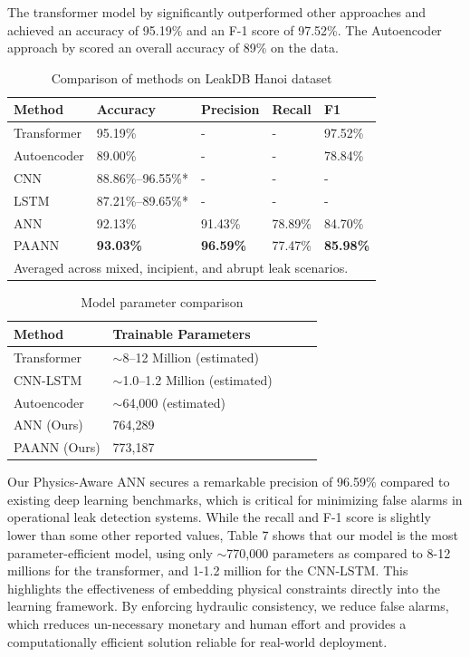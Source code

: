 \documentclass[final,5p,times,twocolumn,authoryear]{elsarticle}
\begin{document}
The transformer model by \cite{s24196294} significantly outperformed other approaches and achieved an accuracy of 95.19\% and an F-1 score of 97.52\%. The Autoencoder approach by \cite{10095760} scored an overall accuracy of 89\% on the data.

\begin{table}[!htbp]
\centering
\caption{Comparison of methods on LeakDB Hanoi dataset}
\label{tab:benchmark_comparison}
\begin{tabular}{@{}lllll@{}}
\toprule
\textbf{Method} & \textbf{Accuracy} & \textbf{Precision} & \textbf{Recall} & \textbf{F1} \\
\midrule
Transformer & 95.19\% & - & - & 97.52\% \\ 
Autoencoder & 89.00\% & - & - & 78.84\% \\
CNN & 88.86\%--96.55\%* & - & - & - \\
LSTM & 87.21\%--89.65\%* & - & - & - \\
ANN & 92.13\% & 91.43\% & 78.89\% & 84.70\% \\
PAANN & \textbf{93.03\%} & \textbf{96.59\%} & 77.47\% & \textbf{85.98\%} \\
\bottomrule
\multicolumn{5}{l}{\footnotesize *Averaged across mixed, incipient, and abrupt leak scenarios.}
\end{tabular}
\end{table}

\begin{table}[!htbp]
\centering
\caption{Model parameter comparison}
\label{tab:parameter_comparison}
\begin{tabular}{@{}lllll@{}}
\toprule
\textbf{Method} & \textbf{Trainable Parameters} \\
\midrule
Transformer & $\sim$8--12 Million (estimated) \\
CNN-LSTM & $\sim$1.0--1.2 Million (estimated) \\
Autoencoder & $\sim$64,000 (estimated) \\
ANN (Ours) & 764,289 \\
PAANN (Ours) & 773,187 \\
\bottomrule
\end{tabular}
\end{table}

Our Physics-Aware ANN secures a remarkable precision of 96.59\% compared to existing deep learning benchmarks, which is critical for minimizing false alarms in operational leak detection systems. While the recall and F-1 score is slightly lower than some other reported values, Table 7 shows that our model is the most parameter-efficient model, using only $\sim$770,000 parameters as compared to 8-12 millions for the transformer, and 1-1.2 million for the CNN-LSTM.
This highlights the effectiveness of embedding physical constraints directly into the learning framework. By enforcing hydraulic consistency, we reduce false alarms, which rreduces un-necessary monetary and human effort and provides a computationally efficient solution reliable for real-world deployment.   
\end{document}
